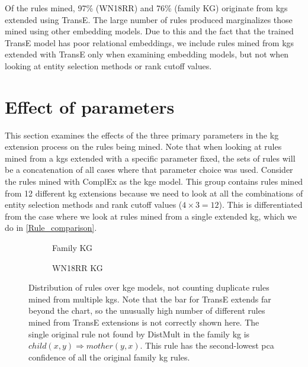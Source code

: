 Of the rules mined, 97\% (WN18RR) and 76\% (family KG) originate from \glspl{kg} extended using TransE. The large number of rules produced marginalizes those mined using other embedding models. Due to this and the fact that the trained TransE model has poor relational embeddings, we include rules mined from \glspl{kg} extended with TransE only when examining embedding models, but not when looking at entity selection methods or rank cutoff values.






\section{Effect of parameters}
This section examines the effects of the three primary parameters in the \gls{kg} extension process on the rules being mined. Note that when looking at rules mined from a \glspl{kg} extended with a specific parameter fixed, the sets of rules will be a concatenation of all cases where that parameter choice was used. Consider the rules mined with ComplEx as the \gls{kge} model. This group contains rules mined from 12 different \gls{kg} extensions because we need to look at all the combinations of entity selection methods and rank cutoff values ($4\times3=12$). This is differentiated from the case where we look at rules mined from a single extended \gls{kg}, which we do in \cref{Rule_comparison}.

\begin{figure}[htbp]
\centering
\begin{subfigure}{1\textwidth}
  \centering
  
  \caption{Family KG}
  \label{rule_dist_models_hbar_family}
\end{subfigure}%
\hfill
\begin{subfigure}{1\textwidth}
  \centering
  
  \caption{WN18RR KG}
  \label{rule_dist_models_hbar_wn18rr}
\end{subfigure}
\caption[Rules and their types over KGE models]{Distribution of rules over \gls{kge} models, not counting duplicate rules mined from multiple \glspl{kg}. Note that the bar for TransE extends far beyond the chart, so the unusually high number of different rules mined from TransE extensions is not correctly shown here. The single original rule not found by DistMult in the family \gls{kg} is $child(x, y) \Rightarrow mother(y,x)$. This rule has the second-lowest \gls{pca} confidence of all the original family \gls{kg} rules.}
\label{rule_dist_models_hbar}
\end{figure}

